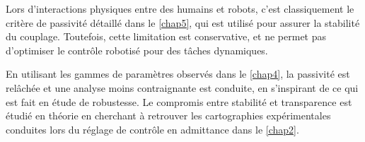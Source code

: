 Lors d'interactions physiques entre des humains et robots, c'est classiquement le critère de passivité détaillé dans le \cref{chap5}, qui est utilisé pour assurer la stabilité du couplage. Toutefois, cette limitation est conservative, et ne permet pas d'optimiser le contrôle robotisé pour des tâches dynamiques. 

En utilisant les gammes de paramètres observés dans le \cref{chap4}, la passivité est relâchée et une analyse moins contraignante est conduite, en s'inspirant de ce qui est fait en étude de robustesse. Le compromis entre stabilité et transparence est étudié en théorie en cherchant à retrouver les cartographies expérimentales conduites lors du réglage de contrôle en admittance dans le \cref{chap2}.